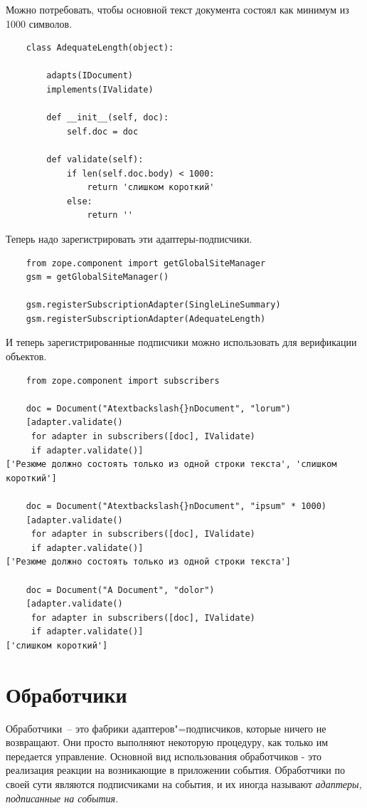 \documentclass[a4paper,openany,twoside,draft]{book}
\providecommand*{\DUroletitlereference}[1]{\textsl{#1}}
\begin{document}
Можно потребовать, чтобы основной текст документа состоял как минимум
из 1000 символов.

\begin{verbatim}
    class AdequateLength(object):

        adapts(IDocument)
        implements(IValidate)

        def __init__(self, doc):
            self.doc = doc

        def validate(self):
            if len(self.doc.body) < 1000:
                return 'слишком короткий'
            else:
                return ''
\end{verbatim}

Теперь надо зарегистрировать эти адаптеры-подписчики.

\begin{verbatim}
    from zope.component import getGlobalSiteManager
    gsm = getGlobalSiteManager()

    gsm.registerSubscriptionAdapter(SingleLineSummary)
    gsm.registerSubscriptionAdapter(AdequateLength)
\end{verbatim}

И теперь зарегистрированные подписчики можно использовать для верификации объектов.

\begin{verbatim}
    from zope.component import subscribers

    doc = Document("Atextbackslash{}nDocument", "lorum")
    [adapter.validate()
     for adapter in subscribers([doc], IValidate)
     if adapter.validate()]
['Резюме должно состоять только из одной строки текста', 'слишком короткий']

    doc = Document("Atextbackslash{}nDocument", "ipsum" * 1000)
    [adapter.validate()
     for adapter in subscribers([doc], IValidate)
     if adapter.validate()]
['Резюме должно состоять только из одной строки текста']

    doc = Document("A Document", "dolor")
    [adapter.validate()
     for adapter in subscribers([doc], IValidate)
     if adapter.validate()]
['слишком короткий']
\end{verbatim}


\section{Обработчики%
  \label{id47}%
}

Обработчики~-- это фабрики адаптеров"=подписчиков, которые ничего не возвращают.  Они просто выполняют некоторую процедуру, как только им передается управление.  Основной вид использования обработчиков - это реализация реакции на возникающие в приложении события.  Обработчики по своей сути являются подписчиками на события, и их иногда называют \DUroletitlereference{адаптеры, подписанные на события}.
\end{document}
